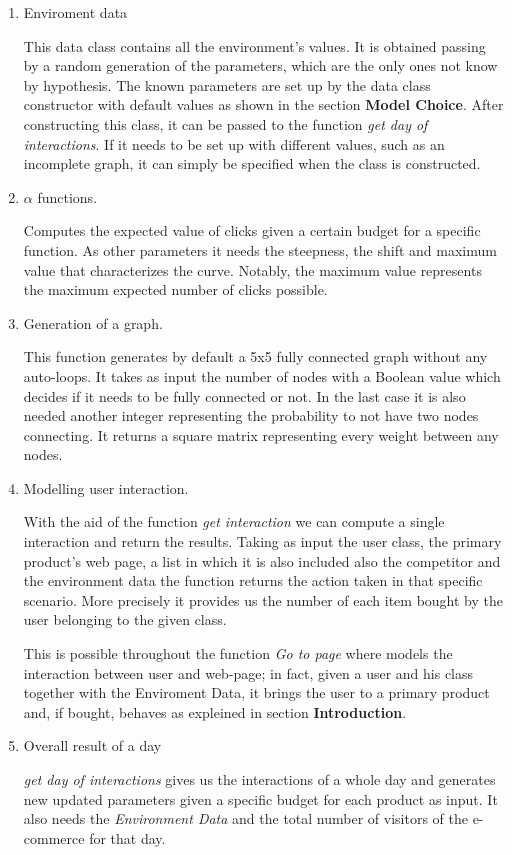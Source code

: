  \begin{enumerate}
     \item Enviroment data
     
     This data class contains all the environment's values. It is obtained passing by a random generation of the parameters, which are the only ones not know by hypothesis. The known parameters are set up by the data class constructor with default values as shown in the section \textbf{Model Choice}. After constructing this class, it can be passed to the function  \textit{get day of interactions}. If it needs to be set up with different values, such as an incomplete graph, it can simply be specified when the class is constructed.
    
     \item $\alpha$ functions.
     
     Computes the expected value of clicks given a certain budget for a specific function. As other parameters it needs the steepness, the shift and maximum value that characterizes the curve. Notably, the maximum value represents the maximum expected number of clicks possible.
  
    \item Generation of a graph.
    
    This function generates by default a 5x5 fully connected graph without any auto-loops. It takes as input the number of nodes with a Boolean value which decides if it needs to be fully connected or not. In the last case it is also needed another integer representing the probability to not have two nodes connecting. It returns a square matrix representing every weight between any nodes.
   
    \item Modelling user interaction.
    
    With the aid of the function \textit{get interaction} we can compute a single interaction and return the results. Taking as input the user class, the primary product's web page, a list in which it is also included also the competitor and the environment data the function returns the action taken in that specific scenario. More precisely it provides us the number of each item bought by the user belonging to the given class.
    
    This is possible throughout the function \textit{Go to page} where models the interaction between user and web-page; in fact, given a user and his class together with the Enviroment Data, it brings the user to a primary product and, if bought, behaves as expleined in section \textbf{Introduction}.
    
    \item Overall result of a day
    
    \textit{get day of interactions} gives us the interactions of a whole day and generates new updated parameters given a specific budget for each product as input. It also needs the \textit{Environment Data} and the total number of visitors of the e-commerce for that day.
    
\end{enumerate}


